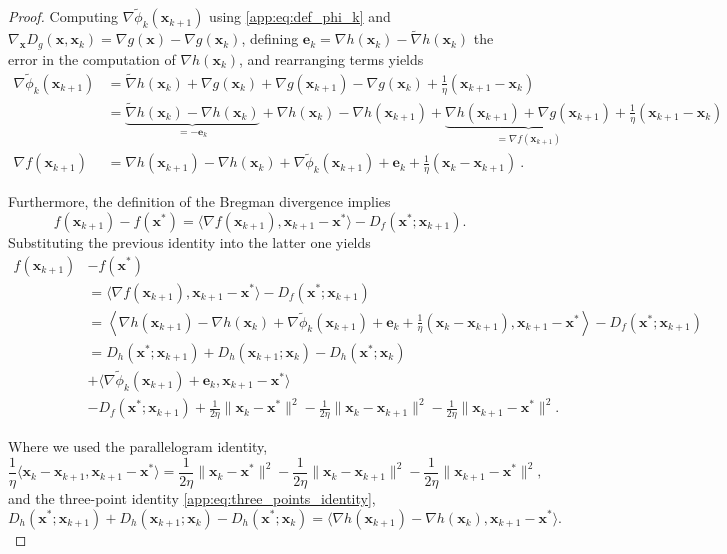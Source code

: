\documentclass{article}
\def\ve{{\bm{e}}}
\def\vx{{\bm{x}}}
\theoremstyle{plain}
\theoremstyle{definition}
\theoremstyle{remark}
\begin{document}
\begin{proof}

    Computing $\nabla \tilde\phi_k(\vx_{k+1})$ using \cref{app:eq:def_phi_k} and $\nabla_\vx D_g(\vx,\vx_k) = \nabla g(\vx) - \nabla g(\vx_k)$, defining $\ve_k = \nabla h(\vx_{k}) - \tilde \nabla h(\vx_k)$ the error in the computation of $\nabla h(\vx_k)$, and rearranging terms yields
    \begin{align*}
        \nabla \tilde\phi_k(\vx_{k+1}) &= \tilde \nabla h(\vx_{k}) + \nabla g(\vx_{k}) + \nabla g(\vx_{k+1}) - \nabla g(\vx_k) + \frac{1}{\eta}(\vx_{k+1} - \vx_k)\\
        &= \underbrace{\tilde{\nabla} h(\vx_k) - \nabla h(\vx_k)}_{= - \ve_k} + \nabla h(\vx_k) - \nabla h(\vx_{k+1}) + \underbrace{\nabla h(\vx_{k+1}) + \nabla g(\vx_{k+1}) }_{= \nabla f(\vx_{k+1})} + \frac{1}{\eta}(\vx_{k+1}-\vx_k)
        \\
        \nabla f(\vx_{k+1}) &= \nabla h(\vx_{k+1}) - \nabla h(\vx_k)  + \nabla \tilde \phi_k(\vx_{k+1}) + \ve_k + \frac{1}{\eta}(\vx_{k}-\vx_{k+1})\ .
    \end{align*}

    Furthermore, the definition of the Bregman divergence implies 
    \[
    f(\vx_{k+1}) - f(\vx^*) = \langle \nabla f(\vx_{k+1}), \vx_{k+1}- \vx^*\rangle - D_f(\vx^*; \vx_{k+1}).
    \]
    Substituting the previous identity into the latter one yields
    \begin{align*}
        f(\vx_{k+1}) &- f(\vx^*)\\
        &= \langle \nabla f(\vx_{k+1}), \vx_{k+1}- \vx^*\rangle - D_f(\vx^*; \vx_{k+1})\\
        &= \left \langle \nabla h(\vx_{k+1}) - \nabla h(\vx_k)  + \nabla \tilde \phi_k(\vx_{k+1}) + \ve_k + \frac{1}{\eta}(\vx_{k}-\vx_{k+1})
        , \vx_{k+1}- \vx^*\right \rangle - D_f(\vx^*; \vx_{k+1})\\
        &=  D_{h}(\vx^*;\vx_{k+1}) + D_h(\vx_{k+1};\vx_k) - D_{h}(\vx^*;\vx_{k}) \\
        &+ \langle \nabla \tilde \phi_k(\vx_{k+1}) + \ve_k, \vx_{k+1} - \vx^* \rangle \\
        &- D_f(\vx^*;\vx_{k+1}) + \frac{1}{2\eta}\|\vx_{k}- \vx^*\|^2 - \frac{1}{2\eta}\|\vx_{k}- \vx_{k+1}\|^2 - \frac{1}{2\eta}\|\vx_{k+1}- \vx^*\|^2.
    \end{align*}

    Where we used the parallelogram identity,
    \[
    \frac{1}{\eta}\langle \vx_k - \vx_{k+1}, \vx_{k+1} - \vx^*\rangle = \frac{1}{2\eta}\|\vx_k  - \vx^*\|^2 - \frac{1}{2\eta}\|\vx_k - \vx_{k+1}\|^2 - \frac{1}{2\eta}\|\vx_{k+1} - \vx^*\|^2,
    \]
    and the three-point identity \cref{app:eq:three_points_identity},
    \[
    D_{h}(\vx^*;\vx_{k+1}) + D_h(\vx_{k+1};\vx_k) - D_{h}(\vx^*;\vx_{k}) = \langle  \nabla h(\vx_{k+1}) - \nabla h(\vx_k), \vx_{k+1} - \vx^*\rangle.
    \]
\end{proof}
\end{document}
